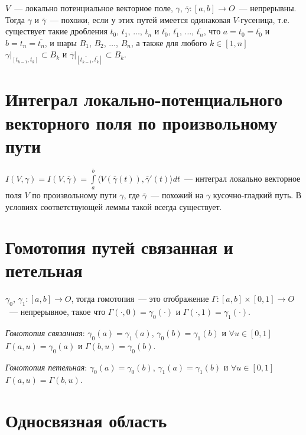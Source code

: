\documentclass{article}
\begin{document}
        $V$~--- локально потенциальное векторное поле, $\gamma$, $\overline{\gamma} : [a, b] \rightarrow O$~--- непрерывны. Тогда $\gamma$ и $\overline{\gamma}$~--- похожи, если у этих путей имеется одинаковая $V$-гусеница, т.е. существует такие дробления $t_0$, $t_1$, $\ldots$, $t_n$ и $\overline{t_0}$, $\overline{t_1}$, $\ldots$, $\overline{t_n}$, что $a = t_0 = \overline{t_0}$ и $b = t_n = \overline{t_n}$, и шары $B_1$, $B_2$, $\ldots$, $B_n$, а также для любого $k \in [1, n]$ $\gamma \big|_{[t_{k - 1}, t_k]} \subset B_k$ и $\overline{\gamma} \big|_{[\overline{t_{k - 1}}, \overline{t_k}]} \subset B_k$.
        
    \newpage
    
    \section{Интеграл локально-потенциального векторного поля по произвольному пути}
    
        $I(V, \gamma) = I(V, \overline{\gamma}) = \int\limits^b_a \langle V \left( \overline{\gamma}(t) \right), \overline{\gamma}'(t) \rangle dt$~--- интеграл локально векторное поля $V$ по произвольному пути $\gamma$, где $\overline{\gamma}$~--- похожий на $\gamma$ кусочно-гладкий путь. В условиях соответствующей леммы такой всегда существует.
        
    \newpage
    
    \section{Гомотопия путей связанная и петельная}
    
        $\gamma_0$, $\gamma_1 : [a, b] \rightarrow O$, тогда гомотопия~--- это отображение $\Gamma : [a, b] \times [0, 1] \rightarrow O$~--- непрерывное, такое что $\Gamma(\cdot, 0) = \gamma_0(\cdot)$ и $\Gamma(\cdot, 1) = \gamma_1(\cdot)$.
        
        \textit{Гомотопия связанная}: $\gamma_0(a) = \gamma_1(a)$, $\gamma_0(b) = \gamma_1(b)$ и $\forall u \in [0, 1]$ $\Gamma(a, u) = \gamma_0(a)$ и $\Gamma(b, u) = \gamma_0(b)$.
        
        \textit{Гомотопия петельная}: $\gamma_0(a) = \gamma_0(b)$, $\gamma_1(a) = \gamma_1(b)$ и $\forall u \in [0, 1]$ $\Gamma(a, u) = \Gamma(b, u)$.
        
    \newpage
    
    \section{Односвязная область}
    
\end{document}
